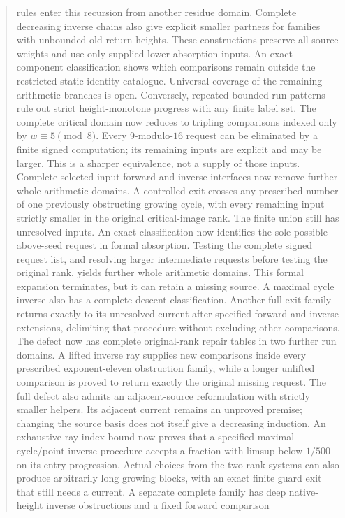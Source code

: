 \documentclass[11pt]{article}
\begin{document}
\begin{abstract}
rules enter this recursion from another residue domain. Complete decreasing
inverse chains also give explicit smaller partners for families with
unbounded old return heights. These constructions preserve all source
weights and use only supplied lower absorption inputs. An exact component
classification shows which comparisons remain outside the restricted static
identity catalogue. Universal coverage of the remaining arithmetic branches
is open. Conversely, repeated bounded run patterns rule out strict
height-monotone progress with any finite label set.
The complete critical domain now reduces to tripling comparisons indexed
only by $w\equiv5\pmod8$. Every $9$-modulo-$16$ request can be eliminated
by a finite signed computation; its remaining inputs are explicit and
may be larger. This is a sharper equivalence, not a supply of those inputs.
Complete selected-input forward and inverse interfaces now remove further
whole arithmetic domains. A controlled exit crosses any prescribed number
of one previously obstructing growing cycle, with every remaining input
strictly smaller in the original critical-image rank. The finite union
still has unresolved inputs.
An exact classification now identifies the sole possible above-seed
request in formal absorption. Testing the complete signed request list,
and resolving larger intermediate requests before testing the original
rank, yields further whole arithmetic domains. This formal expansion
terminates, but it can retain a missing source. A maximal cycle inverse
also has a complete descent classification. Another full exit family
returns exactly to its unresolved current after specified forward and
inverse extensions, delimiting that procedure without excluding other
comparisons.
The defect now has complete original-rank repair tables in two further
run domains. A lifted inverse ray supplies new comparisons inside every
prescribed exponent-eleven obstruction family, while a longer unlifted
comparison is proved to return exactly the original missing request.
The full defect also admits an adjacent-source reformulation with strictly
smaller helpers. Its adjacent current remains an unproved premise; changing
the source basis does not itself give a decreasing induction.
An exhaustive ray-index bound now proves that a specified maximal
cycle/point inverse procedure accepts a fraction with limsup below
$1/500$ on its entry progression. Actual choices from the two rank
systems can also produce arbitrarily long growing blocks, with an exact
finite guard exit that still needs a current. A separate complete family
has deep native-height inverse obstructions and a fixed forward comparison

\end{abstract}
\end{document}
